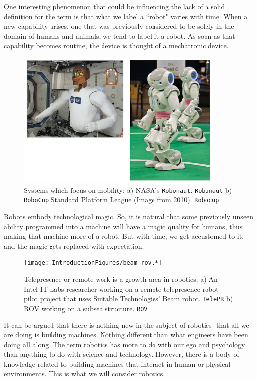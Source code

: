 One interesting phenomenon that could be influencing the lack of a solid
definition for the term is that what we label a ``robot" varies with
time. When a new capability arises, one that was previously considered
to be solely in the domain of humans and animals, we tend to label it a
robot. As soon as that capability becomes routine, the device is thought
of a mechatronic device.

\begin{figure}
\centering
\includegraphics[width=0.9\textwidth,height=\textheight]{IntroductionFigures/nasa-nao.png}
\caption{Systems which focus on mobility: a) NASA's \texttt{Robonaut}.
\texttt{Robonaut} b) \texttt{RoboCup} Standard Platform League (Image
from 2010). \texttt{Robocup}}
\end{figure}

Robots embody technological magic. So, it is natural that some
previously unseen ability programmed into a machine will have a magic
quality for humans, thus making that machine more of a robot. But with
time, we get accustomed to it, and the magic gets replaced with
expectation.

\begin{figure}
\centering
\texttt{[image: IntroductionFigures/beam-rov.*]}
\caption{Telepresence or remote work is a growth area in robotics. a) An
Intel IT Labs researcher working on a remote telepresence robot pilot
project that uses Suitable Technologies' Beam robot. \texttt{TelePR} b)
ROV working on a subsea structure. \texttt{ROV}}
\end{figure}

It can be argued that there is nothing new in the subject of robotics
-that all we are doing is building machines. Nothing different than what
engineers have been doing all along. The term robotics has more to do
with our ego and psychology than anything to do with science and
technology. However, there is a body of knowledge related to building
machines that interact in human or physical environments. This is what
we will consider robotics.

